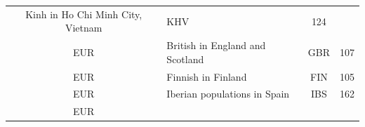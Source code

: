 \documentclass[]{book}
\begin{document}
\begin{longtable}[]{@{}clcc@{}}
\begin{minipage}[t]{0.59\columnwidth}
Kinh in Ho Chi Minh City, Vietnam\strut
\end{minipage} & \begin{minipage}[t]{0.09\columnwidth}\centering\strut
KHV\strut
\end{minipage} & \begin{minipage}[t]{0.07\columnwidth}\centering\strut
124\strut
\end{minipage}\tabularnewline
\begin{minipage}[t]{0.14\columnwidth}\centering\strut
EUR\strut
\end{minipage} & \begin{minipage}[t]{0.59\columnwidth}\raggedright\strut
British in England and Scotland\strut
\end{minipage} & \begin{minipage}[t]{0.09\columnwidth}\centering\strut
GBR\strut
\end{minipage} & \begin{minipage}[t]{0.07\columnwidth}\centering\strut
107\strut
\end{minipage}\tabularnewline
\begin{minipage}[t]{0.14\columnwidth}\centering\strut
EUR\strut
\end{minipage} & \begin{minipage}[t]{0.59\columnwidth}\raggedright\strut
Finnish in Finland\strut
\end{minipage} & \begin{minipage}[t]{0.09\columnwidth}\centering\strut
FIN\strut
\end{minipage} & \begin{minipage}[t]{0.07\columnwidth}\centering\strut
105\strut
\end{minipage}\tabularnewline
\begin{minipage}[t]{0.14\columnwidth}\centering\strut
EUR\strut
\end{minipage} & \begin{minipage}[t]{0.59\columnwidth}\raggedright\strut
Iberian populations in Spain\strut
\end{minipage} & \begin{minipage}[t]{0.09\columnwidth}\centering\strut
IBS\strut
\end{minipage} & \begin{minipage}[t]{0.07\columnwidth}\centering\strut
162\strut
\end{minipage}\tabularnewline
\begin{minipage}[t]{0.14\columnwidth}\centering\strut
EUR\strut
\end{minipage} & \begin{minipage}[t]{0.59\columnwidth}\raggedright\strut

\end{minipage}
\end{longtable}
\end{document}

